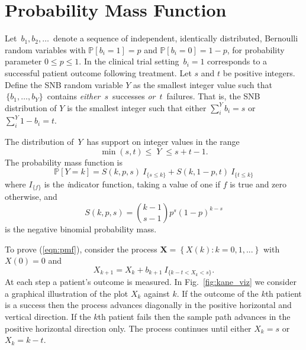 \documentclass[review]{elsarticle}
\begin{document}
\section{Probability Mass Function}
\label{notation.section}

Let $\,b_1, b_2, \ldots \,$ denote a sequence of independent, identically
distributed, Bernoulli random variables with $\mathbb{P}[b_i=1]=p$ and
$\mathbb{P}[b_i = 0] = 1-p$, for
probability parameter $0\leq p \leq 1$. In the clinical trial setting
$\,b_i = 1$ corresponds to a successful patient outcome following treatment.  
Let $s$ and $t$ be positive integers.  Define the SNB random
variable $Y$ as the smallest
integer value such that $\,\{b_1, \ldots , b_Y\}\,$ contains {\em either}
$\,s\,$ successes {\em or} $\,t\,$ failures. That is, the SNB distribution
of $Y$ is the smallest integer such that either
$\sum_i^Y b_i = s$ or $\sum_i^Y 1-b_i = t$.

The distribution of $\,Y\,$ has support on integer values in the range
\begin{equation*}               
     \min(s,t) \leq \; Y \;\leq s+t-1  \label{range.y.eq}.
\end{equation*}
The probability mass function is
\begin{equation} \label{eqn:pmf}
\mathbb{P} [Y=k] = S(k, p, s) \ I_{\{s \leq k\}} + 
  S(k, 1-p, t) \ I_{\{ t \leq k \}}
\end{equation}
where $I_{\{f\}}$ is the {\emph indicator function}, taking a value 
of one if $f$ is true and zero otherwise, and
\begin{equation} \label{eqn:N}
S(k, p, s) = {k-1 \choose s-1} p^s (1-p)^{k-s} 
\end{equation}
is the negative binomial probability mass.

To prove (\ref{eqn:pmf}), consider the
process $\mathbf{X} = \left\{X(k) : k = 0,1,... \right\}$
with $X(0)=0$ and
\begin{equation*} \label{eqn:proc}
X_{k+1} = X_k + b_{k+1} \ I_{\{ k-t < X_k < s\}}.
\end{equation*}
At each step a patient's outcome is measured. In Fig.~\ref{fig:kane_viz} 
we consider a graphical illustration of the plot $X_k$ against
$k$. If the outcome of the $k$th patient is a success then the process 
advances diagonally in the positive horizontal and vertical direction. 
If the $k$th patient fails
then the sample path advances in the positive horizontal direction only. The
process continues until either $X_k = s$ or $X_k = k-t$.
\end{document}
